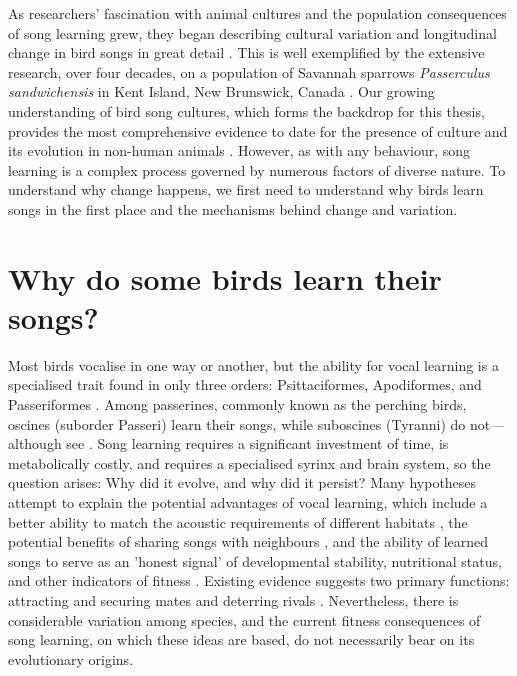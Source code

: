 As researchers’ fascination with animal cultures and the population consequences of song learning grew, they began describing cultural variation and longitudinal change in bird songs in great detail \parencite{nelson2017, zimmerman2016, zann1993, baptista1977, lachlan2003a}. This is well exemplified by the extensive research, over four decades, on a population of Savannah sparrows \textit{Passerculus sandwichensis} in Kent Island, New Brunswick, Canada \autocite{williams2013, mennill2018, williams2019, hensel2022, dixon1978}. Our growing understanding of bird song cultures, which forms the backdrop for this thesis, provides the most comprehensive evidence to date for the presence of culture and its evolution in non-human animals \autocite{slater2003a, aplin2019}. However, as with any behaviour, song learning is a complex process governed by numerous factors of diverse nature. To understand why change happens, we first need to understand why birds learn songs in the first place and the mechanisms behind change and variation.

\section{Why do some birds learn their songs?}
Most birds vocalise in one way or another, but the ability for vocal learning is a specialised trait found in only three orders: Psittaciformes, Apodiformes, and Passeriformes \autocite{kroodsma2004,packert2018}. Among passerines, commonly known as the perching birds, oscines (suborder Passeri) learn their songs, while suboscines (Tyranni) do not---although see \cite{searcy2021,tencate2021}. Song learning requires a significant investment of time, is metabolically costly, and requires a specialised syrinx and brain system, so the question arises: Why did it evolve, and why did it persist? Many hypotheses attempt to explain the potential advantages of vocal learning, which include a better ability to match the acoustic requirements of different habitats \autocite{hansen1979,rios-chelen2012}, the potential benefits of sharing songs with neighbours \autocite{payne1982}, and the ability of learned songs to serve as an 'honest signal’ of developmental stability, nutritional status, and other indicators of fitness \autocite{Nowicki2002,ritchie2008}. Existing evidence suggests two primary functions: attracting and securing mates and deterring rivals \autocite{collins2004}. Nevertheless, there is considerable variation among species, and the current fitness consequences of song learning, on which these ideas are based, do not necessarily bear on its evolutionary origins.

